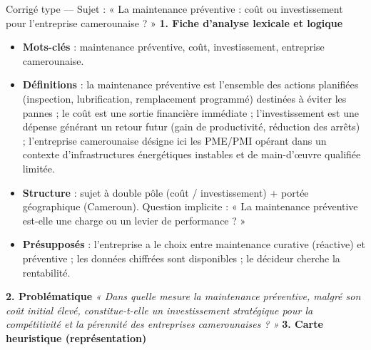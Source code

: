 \documentclass[11pt]{article}
\newcommand{\cle}[1]{{\popxbold\color{popdark}#1}}
\newcounter{popsec}
\newcounter{popsub}
\newcommand{\courssub}[1]{%
  \stepcounter{popsub}%
  \par\vspace{9pt}\noindent{\popxbold\fontsize{11.5}{13}\selectfont\color{popink}{\color{poporange}\thepopsec.\thepopsub}\hspace{6pt}#1}\par\nopagebreak\vspace{4pt}
}
\begin{document}
\courssub{Démarche et corrigé commenté}
\begin{exoresolu}{Corrigé type — Sujet : « La maintenance préventive : coût ou investissement pour l'entreprise camerounaise ? »}
\textbf{1. Fiche d'analyse lexicale et logique}
\begin{itemize}
    \item \textbf{Mots-clés} : maintenance préventive, coût, investissement, entreprise camerounaise.
    \item \textbf{Définitions} : la \cle{maintenance préventive} est l'ensemble des actions planifiées (inspection, lubrification, remplacement programmé) destinées à éviter les pannes ; le \cle{coût} est une sortie financière immédiate ; l'\cle{investissement} est une dépense générant un retour futur (gain de productivité, réduction des arrêts) ; l'\cle{entreprise camerounaise} désigne ici les PME/PMI opérant dans un contexte d'infrastructures énergétiques instables et de main-d'œuvre qualifiée limitée.
    \item \textbf{Structure} : sujet à double pôle (coût / investissement) + portée géographique (Cameroun). Question implicite : « La maintenance préventive est-elle une charge ou un levier de performance ? »
    \item \textbf{Présupposés} : l'entreprise a le choix entre maintenance curative (réactive) et préventive ; les données chiffrées sont disponibles ; le décideur cherche la rentabilité.
\end{itemize}
\textbf{2. Problématique}
\emph{« Dans quelle mesure la maintenance préventive, malgré son coût initial élevé, constitue-t-elle un investissement stratégique pour la compétitivité et la pérennité des entreprises camerounaises ? »}
\textbf{3. Carte heuristique (représentation)}
\begin{center}
\end{center}
\end{exoresolu}
\end{document}
